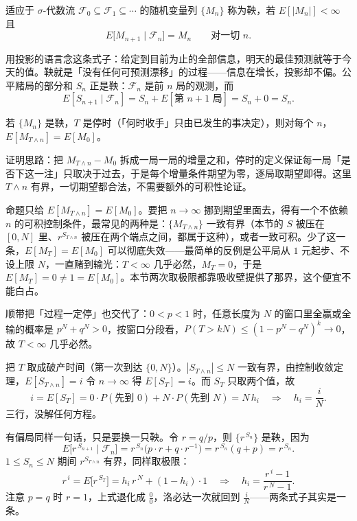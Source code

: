 \begin{definition}[鞅]
适应于 $\sigma$-代数流 $\mathcal{F}_0\subseteq\mathcal{F}_1\subseteq\cdots$ 的随机变量列 $\{M_n\}$ 称为鞅，若 $E[|M_n|]<\infty$ 且
\[
E\big[M_{n+1}\mid\mathcal{F}_n\big]=M_n\qquad\text{对一切 }n .
\]
\end{definition}

用投影的语言念这条式子：给定到目前为止的全部信息，明天的最佳预测就等于今天的值。鞅就是「没有任何可预测漂移」的过程——信息在增长，投影却不偏。公平赌局的部分和 $S_n$ 正是鞅：$\mathcal{F}_n$ 是前 $n$ 局的观测，而
\[
E[S_{n+1}\mid\mathcal{F}_n]=S_n+E[\text{第 }n+1\text{ 局}]=S_n+0=S_n .
\]

\begin{proposition}[有界停时]
若 $\{M_n\}$ 是鞅，$T$ 是停时（「何时收手」只由已发生的事决定），则对每个 $n$，$E[M_{T\wedge n}]=E[M_0]$。
\end{proposition}

证明思路：把 $M_{T\wedge n}-M_0$ 拆成一局一局的增量之和，停时的定义保证每一局「是否下这一注」只取决于过去，于是每个增量条件期望为零，逐局取期望即得。这里 $T\wedge n$ 有界，一切期望都合法，不需要额外的可积性论证。

\begin{remark}
命题只给 $E[M_{T\wedge n}]=E[M_0]$。要把 $n\to\infty$ 挪到期望里面去，得有一个不依赖 $n$ 的可积控制条件，最常见的两种是：$\{M_{T\wedge n}\}$ 一致有界（本节的 $S$ 被压在 $[0,N]$ 里、$r^{S_{T\wedge n}}$ 被压在两个端点之间，都属于这种），或者一致可积。少了这一条，$E[M_T]=E[M_0]$ 可以彻底失效——最简单的反例是公平局从 $1$ 元起步、不设上限 $N$，一直赌到输光：$T<\infty$ 几乎必然，$M_T=0$，于是 $E[M_T]=0\ne1=E[M_0]$。本节两次取极限都靠吸收壁提供了那界，这个便宜不能白占。

顺带把「过程一定停」也交代了：$0<p<1$ 时，任意长度为 $N$ 的窗口里全赢或全输的概率是 $p^N+q^N>0$，按窗口分段看，$P(T>kN)\le(1-p^N-q^N)^k\to0$，故 $T<\infty$ 几乎必然。
\end{remark}

把 $T$ 取成破产时间（第一次到达 $\{0,N\}$）。$|S_{T\wedge n}|\le N$ 一致有界，由控制收敛定理，$E[S_{T\wedge n}]=i$ 令 $n\to\infty$ 得 $E[S_T]=i$。而 $S_T$ 只取两个值，故
\[
i=E[S_T]=0\cdot P(\text{先到 }0)+N\cdot P(\text{先到 }N)=N\,h_i
\quad\Longrightarrow\quad
h_i=\frac iN .
\]
三行，没解任何方程。

有偏局同样一句话，只是要换一只鞅。令 $r=q/p$，则 $\{r^{\,S_n}\}$ 是鞅，因为
\[
E\big[r^{\,S_{n+1}}\mid\mathcal{F}_n\big]
=r^{\,S_n}\big(p\cdot r+q\cdot r^{-1}\big)
=r^{\,S_n}(q+p)=r^{\,S_n}.
\]
$1\le S_n\le N$ 期间 $r^{S_{T\wedge n}}$ 有界，同样取极限：
\[
r^{\,i}=E\big[r^{\,S_T}\big]=h_i\,r^{\,N}+(1-h_i)\cdot 1
\quad\Longrightarrow\quad
h_i=\frac{r^{\,i}-1}{r^{\,N}-1}.
\]
注意 $p=q$ 时 $r=1$，上式退化成 $\frac00$，洛必达一次就回到 $\frac iN$——两条式子其实是一条。


